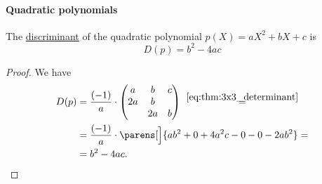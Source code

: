 \paragraph{Quadratic polynomials}

\begin{lemma}\label{thm:quadratic_polynomial_discriminant}
  The \hyperref[def:discriminant]{discriminant} of the quadratic polynomial \( p(X) = a X^2 + b X + c \) is
  \begin{equation}\label{eq:thm:quadratic_polynomial_discriminant}
    D(p) = b^2 - 4ac
  \end{equation}
\end{lemma}
\begin{proof}
  We have
  \begin{align*}
    D(p)
    &=
    \frac {(-1)} a \cdot \begin{pmatrix}
      a  & b  & c  \\
      2a & b  &    \\
         & 2a & b
    \end{pmatrix}
    \reloset {\eqref{eq:thm:3x3_determinant}} = \\ &=
    \frac {(-1)} a \cdot \parens[\Big]{ ab^2 + 0 + 4a^2c - 0 - 0 - 2ab^2 }
    = \\ &=
    b^2 - 4ac.
  \end{align*}
\end{proof}


